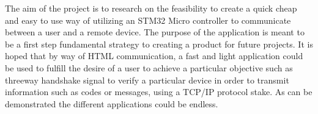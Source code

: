 
The aim of the project is to research on the feasibility to create a quick cheap
 and easy to use way of utilizing an STM32 Micro controller to communicate
 between a user and a remote device. The purpose of the application is meant
 to be a first step fundamental strategy to creating a product for future
 projects. It is hoped that by way of HTML communication, a fast and light
 application could be used to fulfill the desire of a user to achieve a
 particular objective such as threeway handshake signal to verify a particular
 device in order to transmit information such as codes or messages, using a
 TCP/IP protocol stake. As can be demonstrated the different applications could
 be endless.
